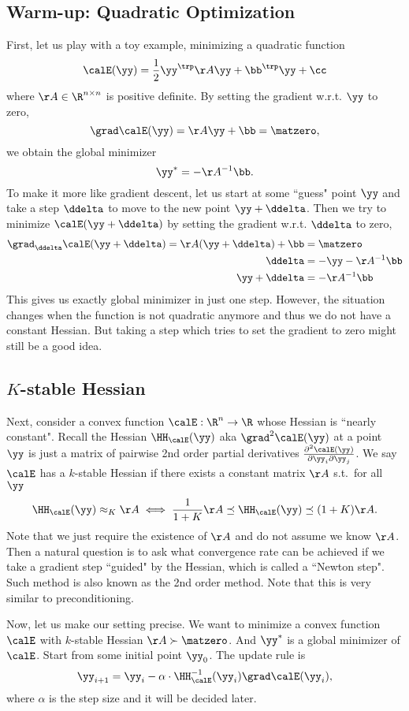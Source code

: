 \subsection{Warm-up: Quadratic Optimization}
First, let us play with a toy example, minimizing a quadratic function
\[ \calE(\yy) = \frac{1}{2}\yy^\trp\AA\yy + \bb^\trp\yy + \cc \]
where $\AA\in\R^{n \times n}$ is positive definite. By setting the gradient w.r.t. $\yy$ to zero,
\[ \grad\calE(\yy) = \AA\yy + \bb = \matzero, \]
we obtain the global minimizer
\[ \yy^* = -\AA^{-1}\bb. \]
To make it more like gradient descent, let us start at some ``guess" point $\yy$ and take a step $\ddelta$ to move to the new point $\yy+\ddelta$. Then we try to minimize $\calE(\yy+\ddelta)$ by setting the gradient w.r.t. $\ddelta$ to zero,
\begin{align*}
  \grad_{\ddelta} \calE(\yy+\ddelta) = \AA(\yy+\ddelta)+\bb &= \matzero \\
  \ddelta & = -\yy-\AA^{-1}\bb \\
  \yy+\ddelta &= -\AA^{-1}\bb
\end{align*}
This gives us exactly global minimizer in just one step.
However, the situation changes when the function is not quadratic anymore and thus we do not have a constant Hessian. But taking a step which tries to set the gradient to zero might still be a good idea.

\subsection{$K$-stable Hessian}
Next, consider a convex function $\calE:\R^n\to\R$ whose Hessian is ``nearly constant". Recall the Hessian $\HH_{\calE}(\yy)$ aka $\grad^2\calE(\yy)$ at a point $\yy$ is just a matrix of pairwise 2nd order partial derivatives $\frac{\partial^2\calE(\yy)}{\partial\yy_i\partial\yy_j}$. We say $\calE$ has a $k$-stable Hessian if there exists a constant matrix $\AA$ s.t.\ for all $\yy$
\[ \HH_{\calE}(\yy) \approx_{K} \AA \iff
\frac{1}{1+K}\AA \preceq \HH_{\calE}(\yy) \preceq (1+K)\AA. \]
Note that we just require the existence of $\AA$ and do not assume we know $\AA$.
Then a natural question is to ask what convergence rate can be achieved if we take a gradient step ``guided" by the Hessian, which is called a ``Newton step". Such method is also known as the 2nd order method. Note that this is very similar to preconditioning.

Now, let us make our setting precise. We want to minimize a convex function $\calE$ with $k$-stable Hessian $\AA\succ\matzero$. And $\yy^*$ is a global minimizer of $\calE$. Start from some initial point $\yy_0$. The update rule is
\[ \yy_{i+1} = \yy_{i} - \alpha \cdot \HH_{\calE}^{-1}(\yy_{i}) \grad \calE(\yy_i), \]
where $\alpha$ is the step size and it will be decided later.

